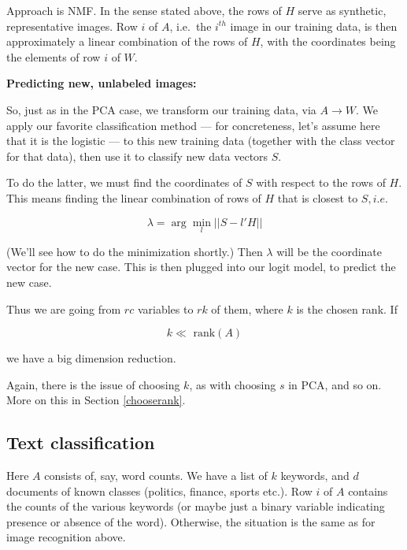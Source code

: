 Approach is NMF.  In the sense stated above, the rows of $H$ serve as synthetic,
representative images.  Row $i$ of $A$, i.e.\ the $i^{th}$ image in our
training data, is then approximately a linear combination of the rows of
$H$, with the coordinates being the elements of row $i$ of $W$.


\textbf{Predicting new, unlabeled images:}

So, just as in the PCA case, we transform our training data, via $A
\rightarrow W$.  We apply our favorite classification method --- for
concreteness, let's assume here that it is the logistic --- to this new
training data (together with the class vector for that data), then use
it to classify new data vectors $S$.  

To do the latter, we must find the coordinates of $S$ with respect to
the rows of $H$.  This means finding the linear combination of rows of
$H$ that is closest to $S, i.e.$

\begin{equation}
\label{slh}
\lambda = \arg\min_l || S - l'H ||
\end{equation}

(We'll see how to do the minimization shortly.) Then $\lambda$ will be
the coordinate vector for the new case.  This is then plugged into our
logit model, to predict the new case.




Thus we are going from $rc$ variables to $rk$ of them, where $k$ is the
chosen rank.  If

\begin{equation}
k \ll \textrm{ rank}(A)
\end{equation}

we have a big dimension reduction.

Again, there is the issue of choosing $k$, as with choosing $s$ in PCA,
and so on.  More on this in Section \ref{chooserank}.

\subsection{Text classification}

Here $A$ consists of, say, word counts. We have a list of $k$ keywords,
and $d$ documents of known classes (politics, finance, sports etc.).
Row $i$ of $A$ contains the counts of the various keywords (or maybe
just a binary variable indicating presence or absence of the word).
Otherwise, the situation is the same as for image recognition above.

